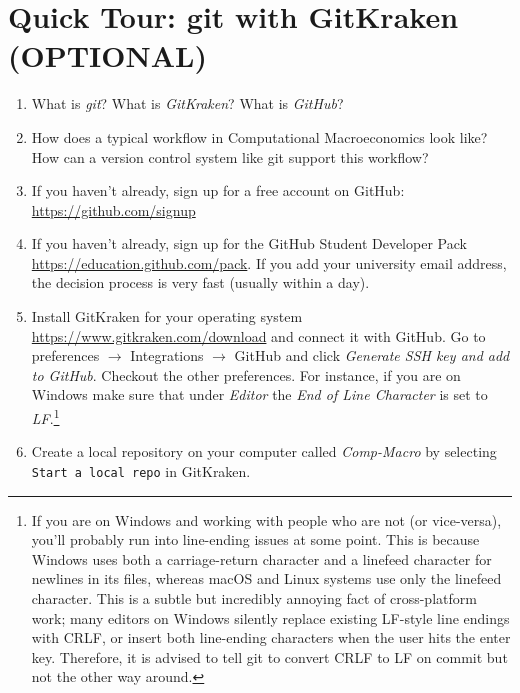 \section[Quick Tour: git with GitKraken]{Quick Tour: git with GitKraken (OPTIONAL)\label{ex:QuickTourGitWithGitKraken}}

\begin{enumerate}

\item
What is \emph{git}? What is \emph{GitKraken}? What is \emph{GitHub}?

\item
How does a typical workflow in Computational Macroeconomics look like?
How can a version control system like git support this workflow?

\item
If you haven't already, sign up for a free account on GitHub: \url{https://github.com/signup}

\item
If you haven't already, sign up for the GitHub Student Developer Pack \url{https://education.github.com/pack}.
If you add your university email address, the decision process is very fast (usually within a day).

\item
Install GitKraken for your operating system \url{https://www.gitkraken.com/download} and connect it with GitHub.
Go to preferences \(\rightarrow \) Integrations \(\rightarrow \) GitHub and click \emph{Generate SSH key and add to GitHub}.
Checkout the other preferences.
For instance, if you are on Windows make sure that under \emph{Editor} the \emph{End of Line Character} is set to \emph{LF}.\footnote{%
  If you are on Windows and working with people who are not (or vice-versa),
    you'll probably run into line-ending issues at some point.
  This is because Windows uses both a carriage-return character and a linefeed character for newlines in its files,
    whereas macOS and Linux systems use only the linefeed character.
  This is a subtle but incredibly annoying fact of cross-platform work;
    many editors on Windows silently replace existing LF-style line endings with CRLF,
    or insert both line-ending characters when the user hits the enter key.
  Therefore, it is advised to tell git to convert CRLF to LF on commit but not the other way around.
}

\item
Create a local repository on your computer called \emph{Comp-Macro} by selecting \texttt{Start a local repo} in GitKraken.


\end{enumerate}
